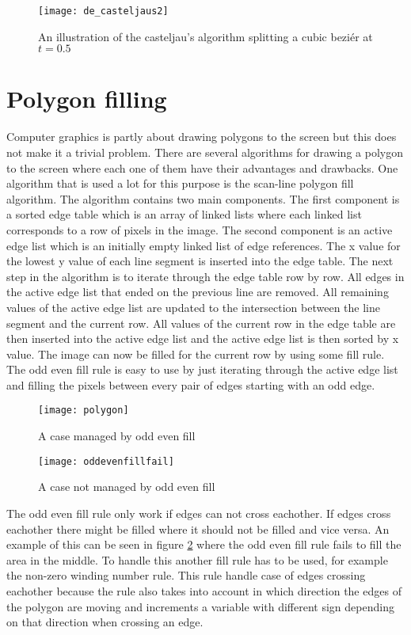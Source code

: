 \begin{figure}[H]
\centerline{\texttt{[image: de\_casteljaus2]}}
\caption{An illustration of the casteljau's algorithm splitting a cubic beziér at $t=0.5$}
\label{fig:decasteljaus}
\end{figure}

\section{Polygon filling}
Computer graphics is partly about drawing polygons to the screen but this does not make it a trivial problem. There are several algorithms for drawing a polygon to the screen where each one of them have their advantages and drawbacks. One algorithm that is used a lot for this purpose is the scan-line polygon fill algorithm. The algorithm contains two main components. The first component is a sorted edge table which is an array of linked lists where each linked list corresponds to a row of pixels in the image. The second component is an active edge list which is an initially empty linked list of edge references. The x value for the lowest y value of each line segment is inserted into the edge table. The next step in the algorithm is to iterate through the edge table row by row. All edges in the active edge list that ended on the previous line are removed. All remaining values of the active edge list are updated to the intersection between the line segment and the current row. All values of the current row in the edge table are then inserted into the active edge list and the active edge list is then sorted by x value. The image can now be filled for the current row by using some fill rule. The odd even fill rule is easy to use by just iterating through the active edge list and filling the pixels between every pair of edges starting with an odd edge.

\begin{figure}[H]
  \texttt{[image: polygon]}
  \caption{A case managed by odd even fill}\label{fig:awesome_image1}
\endminipage\hfill
{}
  \texttt{[image: oddevenfillfail]}
  \caption{A case not managed by odd even fill}\label{fig:awesome_image2}
	\label{fig:poly}
\endminipage\hfill
\end{figure}

The odd even fill rule only work if edges can not cross eachother. If edges cross eachother there might be filled where it should not be filled and vice versa. An example of this can be seen in figure \ref{fig:poly} where the odd even fill rule fails to fill the area in the middle. To handle this another fill rule has to be used, for example the non-zero winding number rule. This rule handle case of edges crossing eachother because the rule also takes into account in which direction the edges of the polygon are moving and increments a variable with different sign depending on that direction when crossing an edge.
